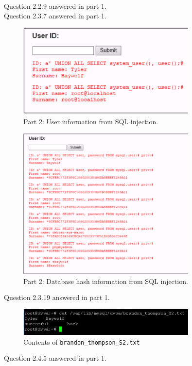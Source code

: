 \documentclass[a4paper]{article}
\begin{document}
	Question 2.2.9 answered in part 1.\\
	
	Question 2.3.7 answered in part 1.\\
	\begin{figure}[ht!]
		\centering
		\includegraphics[width=0.8\textwidth]{2_3_16}
		\caption{Part 2: User information from SQL injection.}
		\label{fig:2_3_17}
	\end{figure}
	\clearpage
	\begin{figure}[ht!]
		\centering
		\includegraphics[width=0.8\textwidth]{2_3_18}
		\caption{Part 2: Database hash information from SQL injection.}
		\label{fig:2_3_18}
	\end{figure}

	Question 2.3.19 answered in part 1.\\

	\begin{figure}[ht!]
		\centering
		\includegraphics[width=0.8\textwidth]{2_4_3}
		\caption{Contents of \texttt{brandon\_thompson\_S2.txt}}
		\label{fig:2_4_3}
	\end{figure}
	
	Question 2.4.5 answered in part 1.
\end{document}
